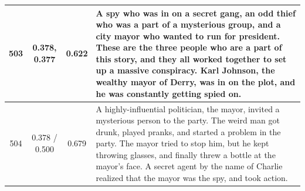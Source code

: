 \begin{table}[ht]
\begin{center}
\begin{tabular}{cccp{8.5cm}}
    \midrule
    503 & 0.378, 0.377 & 0.622 & A spy who was in on a secret gang, an odd thief who was a part of a mysterious group, and a city mayor who wanted to run for president. These are the three people who are a part of this story, and they all worked together to set up a massive conspiracy. Karl Johnson, the wealthy mayor of Derry, was in on the plot, and he was constantly getting spied on. \\
    \midrule
    504 & 0.378 / 0.500 & 0.679 & A highly-influential politician, the mayor, invited a mysterious person to the party. The weird man got drunk, played pranks, and started a problem in the party. The mayor tried to stop him, but he kept throwing glasses, and finally threw a bottle at the mayor's face. A secret agent by the name of Charlie realized that the mayor was the spy, and took action. \\
    \bottomrule
  \end{tabular}
  \end{center}
  \label{app:iter_stories_b1}
\end{table}

